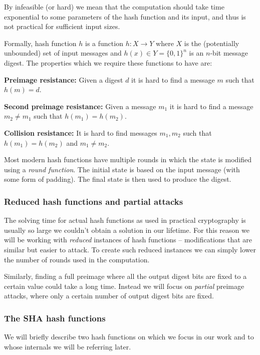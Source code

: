 By infeasible (or hard) we mean that the computation should take time exponential to some parameters of the hash function and its input, and thus is not practical for sufficient input sizes.

Formally, hash function $h$ is a function $h: X \to Y$ where $X$ is the (potentially unbounded) set of input messages and $h(x) \in Y = \{0,1\}^n$ is an $n$-bit message digest.
The properties which we require these functions to have are:

\textbf{Preimage resistance:} Given a digest $d$ it is hard to find a message $m$ such that $h(m) = d$.

\textbf{Second preimage resistance:} Given a message $m_1$ it is hard to find a message $m_2 \neq m_1$ such that $h(m_1) = h(m_2)$.

\textbf{Collision resistance:} It is hard to find messages $m_1,m_2$ such that $h(m_1) = h(m_2)$ and $m_1 \neq m_2$.


Most modern hash functions have multiple rounds in which the state is modified using a \emph{round function}.
The initial state is based on the input message (with some form of padding).
The final state is then used to produce the digest.

\subsubsection{Reduced hash functions and partial attacks}
The solving time for actual hash functions as used in practical cryptography is usually so large we couldn't obtain a solution in our lifetime.
For this reason we will be working with \emph{reduced} instances of hash functions -- modifications that are similar but easier to attack.
To create such reduced instances we can simply lower the number of rounds used in the computation.

Similarly, finding a full preimage where all the output digest bits are fixed to a certain value could take a long time.
Instead we will focus on \emph{partial} preimage attacks, where only a certain number of output digest bits are fixed.

\subsubsection{The SHA hash functions}
We will briefly describe two hash functions on which we focus in our work and to whose internals we will be referring later.

